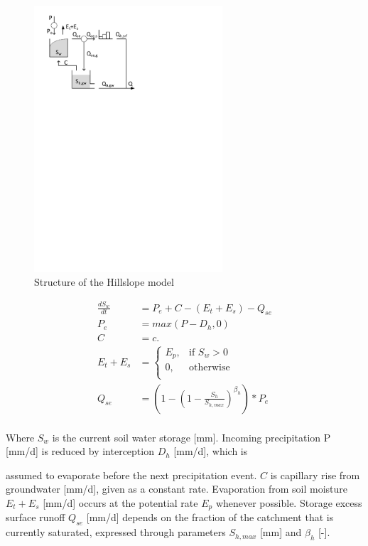 { 																	%
\begin{figure}
\includegraphics[trim=1cm 20.3cm 9cm 1cm,width=7cm,keepaspectratio]{./AppA_files/13_schematic.pdf}
\caption{Structure of the Hillslope model} \label{fig:13_schematic}
\end{figure}

\begin{align}
	\frac{dS_w}{dt} &= P_e+C-(E_t+E_s)-Q_{se} \\
	P_e &= max(P-D_h,0)\\
	C &= c.\\
	E_t+E_s &= 
	\begin{cases}
		E_p, & \text{if } S_w > 0 \\
		0, & \text{otherwise}\\
	\end{cases}\\
	Q_{se} &= \left(1-\left(1-\frac{S_h}{S_{h,max}}\right)^{\beta_h}\right)*P_e\\
\end{align}

Where $S_w$ is the current soil water storage [mm]. Incoming precipitation P [mm/d] is reduced by interception $D_h$ [mm/d], which is 

} %

assumed to evaporate before the next precipitation event. $C$ is capillary rise from groundwater [mm/d], given as a constant rate. Evaporation from soil moisture $E_t+E_s$ [mm/d] occurs at the potential rate $E_p$ whenever possible. Storage excess surface runoff $Q_{se}$ [mm/d] depends on the fraction of the catchment that is currently saturated, expressed through parameters $S_{h,max}$ [mm] and $\beta_h$ [-]. 

